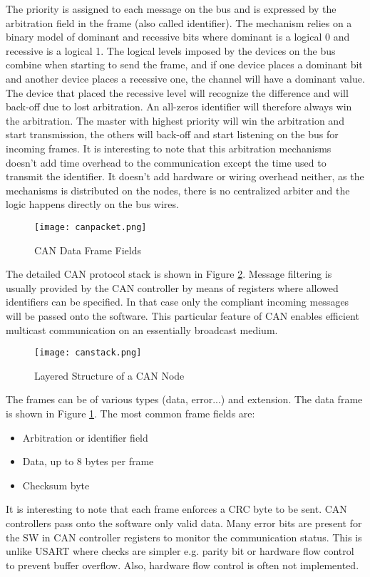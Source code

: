 \documentclass[11pt]{article} %
\begin{document}
The priority is assigned to each message on the bus and is expressed by the arbitration field in the frame (also called identifier). The mechanism relies on a binary model of dominant and recessive bits where dominant is a logical 0 and recessive is a logical 1. The logical levels imposed by the devices on the bus combine when starting to send the frame, and if one device places a dominant bit and another device places a recessive one, the channel will have a dominant value. The device that placed the recessive level will recognize the difference and will back-off due to lost arbitration. An all-zeros identifier will therefore always win the arbitration. The master with highest priority will win the arbitration and start transmission, the others will back-off and  start listening on the bus for incoming frames. It is interesting to note that this arbitration mechanisms doesn't add time overhead to the communication except the time used to transmit the identifier. It doesn't add hardware or wiring overhead neither, as the mechanisms is distributed on the nodes, there is no centralized arbiter and the logic happens directly on the bus wires.

\begin{figure}[htbp]
\begin{center}
\texttt{[image: canpacket.png]}
\end{center}
\caption{CAN Data Frame Fields}
\label{canpacket}
\end{figure}

The detailed CAN protocol stack is shown in Figure \ref{canstack}. Message filtering is usually provided by the CAN controller by means of registers where allowed identifiers can be specified. In that case only the compliant incoming messages will be passed onto the software. This particular feature of CAN enables efficient multicast communication on an essentially broadcast medium.

\begin{figure}[htbp]
\begin{center}
\texttt{[image: canstack.png]}
\end{center}
\caption{Layered Structure of a CAN Node}
\label{canstack}
\end{figure}


The frames can be of various types (data, error...) and extension. The data frame is shown in Figure \ref{canpacket}. The most common frame fields are:
\begin{itemize}
\item Arbitration or identifier field
\item Data, up to 8 bytes per frame
\item Checksum byte
\end{itemize}
It is interesting to note that each frame enforces a CRC byte to be sent. CAN controllers pass onto the software only valid data.  Many error bits are present for the SW in CAN controller registers to monitor the communication status. This is unlike USART where checks are simpler e.g. parity bit or hardware flow control to prevent buffer overflow. Also, hardware flow control is often not implemented.
\end{document}
